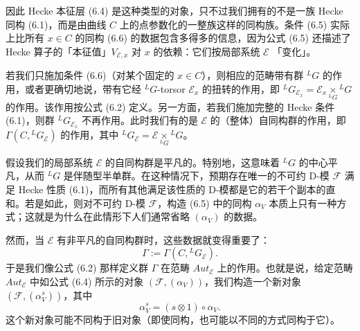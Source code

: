 
因此 Hecke 本征层 (6.4) 是这种类型的对象，只不过我们拥有的不是一族 Hecke 同构 (6.1)，而是由曲线 $C$ 上的点参数化的一整族这样的同构族。条件 (6.5) 实际上比所有 $x\in C$ 的同构 (6.6) 的数据包含多得多的信息，因为公式 (6.5) 还描述了 Hecke 算子的「本征值」$V_{\mathcal{E},x}$ 对 $x$ 的依赖：它们按局部系统 $\mathcal{E}$ 「变化」。

若我们只施加条件 (6.6)（对某个固定的 $x\in C$），则相应的范畴带有群 ${}^LG$ 的作用，或者更确切地说，带有它经 ${}^LG$-torsor $\mathcal{E}_x$ 的扭转的作用，即 ${}^LG_{\mathcal{E}_x} = \mathcal{E}_x\underset{{}^LG}{\times}{}^LG$ 的作用。该作用按公式 (6.2) 定义。另一方面，若我们施加完整的 Hecke 条件 (6.1)，则群 ${}^LG_{\mathcal{E}_x}$ 不再作用。此时我们有的是 $\mathcal{E}$ 的（整体）自同构群的作用，即 $\Gamma(C,{}^LG_{\mathcal{E}})$ 的作用，其中 ${}^LG_{\mathcal{E}} = \mathcal{E}\underset{{}^LG}{\times}{}^LG$。


假设我们的局部系统 $\mathcal{E}$ 的自同构群是平凡的。特别地，这意味着 ${}^LG$ 的中心平凡，从而 ${}^LG$ 是伴随型半单群。在这种情况下，预期存在唯一的不可约 D-模
$\mathcal{F}$ 满足 Hecke 性质 (6.1)，而所有其他满足该性质的 D-模都是它的若干个副本的直和。若是如此，则对不可约 D-模 $\mathcal{F}$，构造 (6.5) 中的同构 $\alpha_V$ 本质上只有一种方式；这就是为什么在此情形下人们通常省略 $(\alpha_V)$ 的数据。

然而，当 $\mathcal{E}$ 有非平凡的自同构群时，这些数据就变得重要了：
\[
\Gamma := \Gamma(C,{}^LG_{\mathcal{E}}).
\]
于是我们像公式 (6.2) 那样定义群 $\Gamma$ 在范畴 $Aut_{\mathcal{E}}$ 上的作用。也就是说，给定范畴 $Aut_{\mathcal{E}}$ 中如公式 (6.4) 所示的对象 $(\mathcal{F},(\alpha_V))$，我们构造一个新对象 $(\mathcal{F},(\alpha_V^s))$，其中
\[
\alpha_V^s = (s\otimes1)\circ\alpha_V.
\]
这个新对象可能不同构于旧对象（即使同构，也可能以不同的方式同构于它）。

